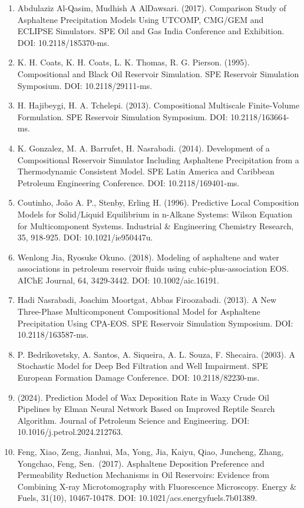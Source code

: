 \documentclass[11pt]{extarticle}
\begin{document}
\begin{enumerate}
\item
  Abdulaziz Al-Qasim, Mudhish A AlDawsari. (2017). Comparison Study of Asphaltene Precipitation Models Using UTCOMP, CMG/GEM and ECLIPSE Simulators. SPE Oil and Gas India Conference and Exhibition. DOI: 10.2118/185370-ms.
\item
  K. H. Coats, K. H. Coats, L. K. Thomas, R. G. Pierson. (1995). Compositional and Black Oil Reservoir Simulation. SPE Reservoir Simulation Symposium. DOI: 10.2118/29111-ms.
\item
  H. Hajibeygi, H. A. Tchelepi. (2013). Compositional Multiscale Finite-Volume Formulation. SPE Reservoir Simulation Symposium. DOI: 10.2118/163664-ms.
\item
  K. Gonzalez, M. A. Barrufet, H. Nasrabadi. (2014). Development of a Compositional Reservoir Simulator Including Asphaltene Precipitation from a Thermodynamic Consistent Model. SPE Latin America and Caribbean Petroleum Engineering Conference. DOI: 10.2118/169401-ms.
\item
  Coutinho, João A. P., Stenby, Erling H. (1996). Predictive Local Composition Models for Solid/Liquid Equilibrium in n-Alkane Systems: Wilson Equation for Multicomponent Systems. Industrial \& Engineering Chemistry Research, 35, 918-925. DOI: 10.1021/ie950447u.
\item
  Wenlong Jia, Ryosuke Okuno. (2018). Modeling of asphaltene and water associations in petroleum reservoir fluids using cubic‐plus‐association EOS. AIChE Journal, 64, 3429-3442. DOI: 10.1002/aic.16191.
\item
  Hadi Nasrabadi, Joachim Moortgat, Abbas Firoozabadi. (2013). A New Three-Phase Multicomponent Compositional Model for Asphaltene Precipitation Using CPA-EOS. SPE Reservoir Simulation Symposium. DOI: 10.2118/163587-ms.
\item
  P. Bedrikovetsky, A. Santos, A. Siqueira, A. L. Souza, F. Shecaira. (2003). A Stochastic Model for Deep Bed Filtration and Well Impairment. SPE European Formation Damage Conference. DOI: 10.2118/82230-ms.
\item
  (2024). Prediction Model of Wax Deposition Rate in Waxy Crude Oil Pipelines by Elman Neural Network Based on Improved Reptile Search Algorithm. Journal of Petroleum Science and Engineering. DOI: 10.1016/j.petrol.2024.212763.
\item
  Feng, Xiao, Zeng, Jianhui, Ma, Yong, Jia, Kaiyu, Qiao, Juncheng, Zhang, Yongchao, Feng, Sen.~(2017). Asphaltene Deposition Preference and Permeability Reduction Mechanisms in Oil Reservoirs: Evidence from Combining X-ray Microtomography with Fluorescence Microscopy. Energy \& Fuels, 31(10), 10467-10478. DOI: 10.1021/acs.energyfuels.7b01389.

\end{enumerate}
\end{document}
